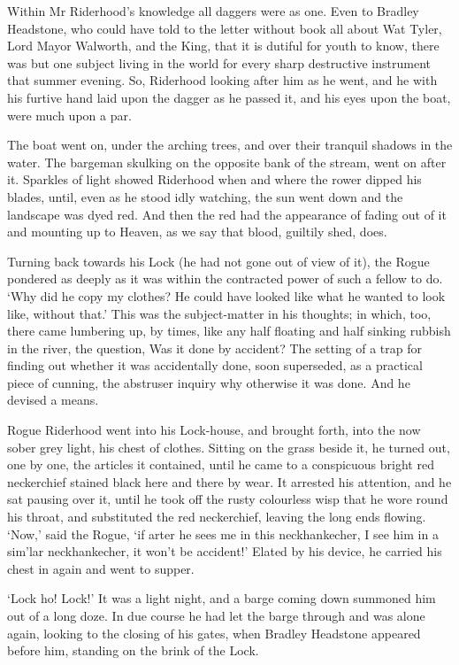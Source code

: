 Within Mr Riderhood’s knowledge all daggers were as one. Even to Bradley
Headstone, who could have told to the letter without book all about Wat
Tyler, Lord Mayor Walworth, and the King, that it is dutiful for youth
to know, there was but one subject living in the world for every sharp
destructive instrument that summer evening. So, Riderhood looking after
him as he went, and he with his furtive hand laid upon the dagger as he
passed it, and his eyes upon the boat, were much upon a par.

The boat went on, under the arching trees, and over their tranquil
shadows in the water. The bargeman skulking on the opposite bank of the
stream, went on after it. Sparkles of light showed Riderhood when
and where the rower dipped his blades, until, even as he stood idly
watching, the sun went down and the landscape was dyed red. And then the
red had the appearance of fading out of it and mounting up to Heaven, as
we say that blood, guiltily shed, does.

Turning back towards his Lock (he had not gone out of view of it), the
Rogue pondered as deeply as it was within the contracted power of such
a fellow to do. ‘Why did he copy my clothes? He could have looked like
what he wanted to look like, without that.’ This was the subject-matter
in his thoughts; in which, too, there came lumbering up, by times, like
any half floating and half sinking rubbish in the river, the question,
Was it done by accident? The setting of a trap for finding out whether
it was accidentally done, soon superseded, as a practical piece of
cunning, the abstruser inquiry why otherwise it was done. And he devised
a means.

Rogue Riderhood went into his Lock-house, and brought forth, into the
now sober grey light, his chest of clothes. Sitting on the grass beside
it, he turned out, one by one, the articles it contained, until he came
to a conspicuous bright red neckerchief stained black here and there by
wear. It arrested his attention, and he sat pausing over it, until he
took off the rusty colourless wisp that he wore round his throat, and
substituted the red neckerchief, leaving the long ends flowing. ‘Now,’
said the Rogue, ‘if arter he sees me in this neckhankecher, I see him in
a sim’lar neckhankecher, it won’t be accident!’ Elated by his device, he
carried his chest in again and went to supper.

‘Lock ho! Lock!’ It was a light night, and a barge coming down summoned
him out of a long doze. In due course he had let the barge through
and was alone again, looking to the closing of his gates, when Bradley
Headstone appeared before him, standing on the brink of the Lock.

